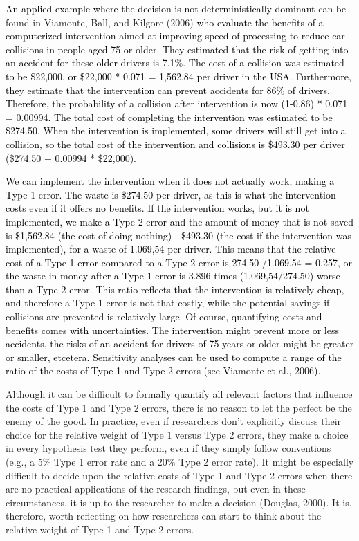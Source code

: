 \documentclass[
  english,
  ,man, a4paper,floatsintext]{apa6}
\begin{document}
\textcolor{black}{An applied example where the decision is not deterministically dominant} can be found in Viamonte, Ball, and Kilgore (2006)
\textcolor{black}{who evaluate the benefits of a computerized intervention aimed at improving speed of processing to reduce car collisions in people aged 75 or older. They estimated that the risk of getting into an accident for these older drivers is 7.1\%. The cost of a collision was estimated to be \$22,000, or \$22,000 * 0.071 = 1,562.84 per driver in the USA. Furthermore, they estimate that the intervention can prevent accidents for 86\% of drivers. Therefore, the probability of a collision after intervention is now (1-0.86) * 0.071 = 0.00994. The total cost of completing the intervention was estimated to be \$274.50. When the intervention is implemented, some drivers will still get into a collision, so the total cost of the intervention and collisions is \$493.30 per driver (\$274.50 + 0.00994 * \$22,000).}

\textcolor{black}{We can implement the intervention when it does not actually work, making a Type 1 error. The waste is \$274.50 per driver, as this is what the intervention costs even if it offers no benefits. If the intervention works, but it is not implemented, we make a Type 2 error and the amount of money that is not saved is \$1,562.84 (the cost of doing nothing) - \$493.30 (the cost if the intervention was implemented), for a waste of 1.069,54 per driver. This means that the relative cost of a Type 1 error compared to a Type 2 error is 274.50 /1.069,54 = 0.257, or the waste in money after a Type 1 error is 3.896 times (1.069,54/274.50) worse than a Type 2 error. This ratio reflects that the intervention is relatively cheap, and therefore a Type 1 error is not that costly, while the potential savings if collisions are prevented is relatively large. Of course, quantifying costs and benefits comes with uncertainties. The intervention might prevent more or less accidents, the risks of an accident for drivers of 75 years or older might be greater or smaller, etcetera. Sensitivity analyses can be used to compute a range of the ratio of the costs of Type 1 and Type 2 errors (see Viamonte et al., 2006). 
}

Although it can be difficult to formally quantify all relevant factors that influence the costs of Type 1 and Type 2 errors, there is no reason to let the perfect be the enemy of the good. In practice, even if researchers don't explicitly discuss their choice for the relative weight of Type 1 versus Type 2 errors, they make a choice in every hypothesis test they perform, even if they simply follow conventions (e.g., a 5\% Type 1 error rate and a 20\% Type 2 error rate). It might be especially difficult to decide upon the relative costs of Type 1 and Type 2 errors when there are no practical applications of the research findings, but even in these circumstances, it is up to the researcher to make a decision (Douglas, 2000). It is, therefore, worth reflecting on how researchers can start to think about the relative weight of Type 1 and Type 2 errors.
\end{document}

